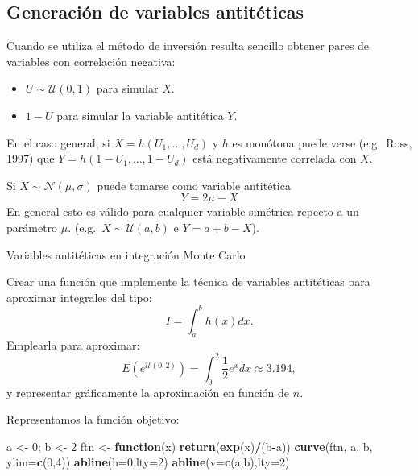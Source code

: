 \documentclass[
]{book}
\newenvironment{Shaded}{\begin{snugshade}}{\end{snugshade}}
\newcommand{\ControlFlowTok}[1]{\textcolor[rgb]{0.13,0.29,0.53}{\textbf{#1}}}
\newcommand{\DataTypeTok}[1]{\textcolor[rgb]{0.13,0.29,0.53}{#1}}
\newcommand{\DecValTok}[1]{\textcolor[rgb]{0.00,0.00,0.81}{#1}}
\newcommand{\KeywordTok}[1]{\textcolor[rgb]{0.13,0.29,0.53}{\textbf{#1}}}
\newcommand{\NormalTok}[1]{#1}
\newcommand{\OperatorTok}[1]{\textcolor[rgb]{0.81,0.36,0.00}{\textbf{#1}}}
\newcommand{\StringTok}[1]{\textcolor[rgb]{0.31,0.60,0.02}{#1}}
\theoremstyle{break}
\theoremstyle{definition}
\theoremstyle{definition}
\theoremstyle{definition}
\theoremstyle{remark}
\let\BeginKnitrBlock\begin \let\EndKnitrBlock\end
\begin{document}
\hypertarget{generaciuxf3n-de-variables-antituxe9ticas}{%
\subsection{Generación de variables antitéticas}\label{generaciuxf3n-de-variables-antituxe9ticas}}

Cuando se utiliza el método de inversión resulta sencillo obtener
pares de variables con correlación negativa:

\begin{itemize}
\item
  \(U\sim \mathcal{U}\left( 0,1\right)\) para simular \(X\).
\item
  \(1-U\) para simular la variable antitética \(Y\).
\end{itemize}

En el caso general, si \(X=h\left( U_{1},\ldots,U_{d}\right)\) y
\(h\) es monótona puede verse (e.g.~Ross, 1997) que
\(Y=h\left( 1-U_{1},\ldots,1-U_{d}\right)\) está negativamente
correlada con \(X\).

Si \(X\sim \mathcal{N}(\mu,\sigma)\) puede tomarse como variable
antitética \[Y=2\mu-X\]
En general esto es válido para cualquier variable
simétrica repecto a un parámetro \(\mu\).
(e.g.~\(X\sim \mathcal{U}(a,b)\) e \(Y=a+b-X\)).

\BeginKnitrBlock{exercise}
\protect\hypertarget{exr:mc-integrala}{}{\label{exr:mc-integrala} }Variables antitéticas en integración Monte Carlo
\EndKnitrBlock{exercise}

Crear una función que implemente la técnica de variables antitéticas para aproximar integrales del tipo:
\[I=\int_{a}^{b}h\left(  x\right)  dx.\]
Emplearla para aproximar:
\[E\left(  e^{\mathcal{U}(0,2)}\right)  =\int_{0}^{2}\frac{1}{2}e^{x}dx\approx3.194,\label{integralmc}\]
y representar gráficamente la aproximación en función de \(n\).

Representamos la función objetivo:

\begin{Shaded}
\begin{Highlighting}[]
\NormalTok{a <-}\StringTok{ }\DecValTok{0}\NormalTok{; b <-}\StringTok{ }\DecValTok{2}
\NormalTok{ftn <-}\StringTok{ }\ControlFlowTok{function}\NormalTok{(x) }\KeywordTok{return}\NormalTok{(}\KeywordTok{exp}\NormalTok{(x)}\OperatorTok{/}\NormalTok{(b}\OperatorTok{-}\NormalTok{a))}
\KeywordTok{curve}\NormalTok{(ftn, a, b, }\DataTypeTok{ylim=}\KeywordTok{c}\NormalTok{(}\DecValTok{0}\NormalTok{,}\DecValTok{4}\NormalTok{))}
\KeywordTok{abline}\NormalTok{(}\DataTypeTok{h=}\DecValTok{0}\NormalTok{,}\DataTypeTok{lty=}\DecValTok{2}\NormalTok{)}
\KeywordTok{abline}\NormalTok{(}\DataTypeTok{v=}\KeywordTok{c}\NormalTok{(a,b),}\DataTypeTok{lty=}\DecValTok{2}\NormalTok{)}
\end{Highlighting}
\end{Shaded}
\end{document}
